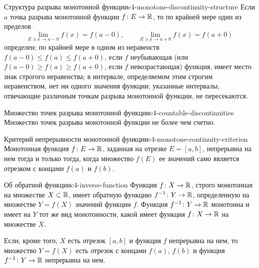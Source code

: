 \begin{corollary}{Структура разрыва монотонной функции}{c4-monotone-discontinuity-structure}
  Если $a$ \textemdash{} точка разрыва монотонной функции
  $f\colon E\to\mathbb{R}$, то по крайней мере один из пределов
  \[
    \lim_{E\ni x\to a-0}f(x)=f(a-0),
    \qquad
    \lim_{E\ni x\to a+0}f(x)=f(a+0)
  \]
  определен; по крайней мере в одном из неравенств
  $f(a-0)\le f(a)\le f(a+0)$, если $f$ \textemdash{} неубывающая (или
  $f(a-0)\ge f(a)\ge f(a+0)$, если $f$ \textemdash{} невозрастающая)
  функция, имеет место знак строгого неравенства; в интервале, определяемом
  этим строгим неравенством, нет ни одного значения функции; указанные
  интервалы, отвечающие различным точкам разрыва монотонной функции, не
  пересекаются.
\end{corollary}

\begin{corollary}{Множество точек разрыва монотонной функции}{c4-countable-discontinuities}
  Множество точек разрыва монотонной функции не более чем счетно.
\end{corollary}

\begin{proposition}{Критерий непрерывности монотонной функции}{c4-monotone-continuity-criterion}
  Монотонная функция $f\colon E\to\mathbb{R}$, заданная на отрезке $E=[a,b]$,
  непрерывна на нем тогда и только тогда, когда множество $f(E)$ ее значений
  само является отрезком с концами $f(a)$ и $f(b)$.
\end{proposition}

\begin{theorem}{Об обратной функции}{c4-inverse-function}
  Функция $f\colon X\to\mathbb{R}$, строго монотонная на множестве $X\subset\mathbb{R}$,
  имеет обратную функцию $f^{-1}\colon Y\to\mathbb{R}$, определенную на множестве
  $Y=f(X)$ значений функции $f$. Функция $f^{-1}\colon Y\to\mathbb{R}$ монотонна и
  имеет на $Y$ тот же вид монотонности, какой имеет функция
  $f\colon X\to\mathbb{R}$ на множестве $X$.

  Если, кроме того, $X$ есть отрезок $[a,b]$ и функция $f$ непрерывна на
  нем, то множество $Y=f(X)$ есть отрезок с концами $f(a)$, $f(b)$ и функция
  $f^{-1}\colon Y\to\mathbb{R}$ непрерывна на нем.
\end{theorem}
